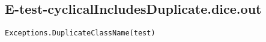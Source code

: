 \subsection{E-test-cyclicalIncludesDuplicate.dice.out}
\begin{verbatim}
Exceptions.DuplicateClassName(test)

\end{verbatim}